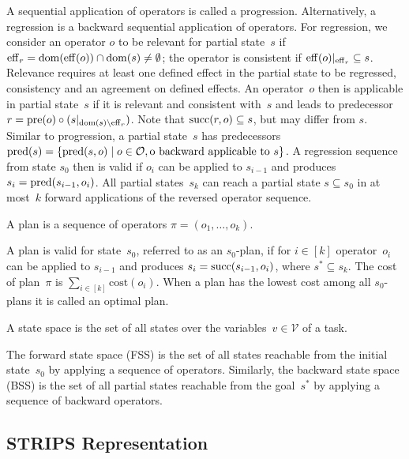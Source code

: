 A sequential application of operators is called a progression. Alternatively, a regression is a backward sequential application of operators. For regression, we consider an operator $o$ to be relevant for partial state~$s$ if $\operatorname{eff}_r=\operatorname{dom}(\operatorname{eff}(o))\cap\operatorname{dom}(s)\neq\emptyset$; the operator is consistent if $\operatorname{eff}(o)|_{\operatorname{eff}_r} \subseteq s$. Relevance requires at least one defined effect in the partial state to be regressed, consistency and an agreement on defined effects. An operator~$o$ then is  applicable in partial state~$s$ if it is relevant and consistent with~$s$ and leads to predecessor $r=\operatorname{pre}(o)\circ (s|_{\operatorname{dom}(s)\setminus\operatorname{eff}_r})$. Note that $\operatorname{succ}(r,o)\subseteq s$, but may differ from $s$. Similar to progression, a partial state~$s$ has predecessors $\operatorname{pred}(s)=\{\operatorname{pred}(s,o)\mid o\in \mathcal{O}, \text{o backward applicable to }s\}$. A regression sequence from state $s_0$ then is valid if $o_i$ can be applied to $s_{i-1}$ and produces $s_i=\operatorname{pred}(s_{i-1},o_i)$. All partial states~$s_k$ can reach a partial state $s\subseteq s_0$ in at most~$k$ forward applications of the reversed operator sequence.

\begin{definition}[Plan]\label{def:plan}
    A plan is a sequence of operators $\pi=(o_1,\ldots,o_k)$.
\end{definition}

A plan is valid for state~$s_0$, referred to as an $s_0$-plan, if for $i\in[k]$ operator~$o_i$ can be applied to $s_{i-1}$ and produces $s_i=\operatorname{succ}(s_{i-1},o_i)$, where $s^* \subseteq s_k$. The cost of plan~$\pi$ is $\sum_{i\in[k]} \text{cost}(o_i)$. When a plan has the lowest cost among all $s_0$-plans it is called an optimal plan.

\begin{definition}\label{def:statespace}
    A state space is the set of all states over the variables~$v \in \mathcal{V}$ of a task.
\end{definition}

The forward state space (FSS) is the set of all states reachable from the initial state~$s_0$ by applying a sequence of operators. Similarly, the backward state space (BSS) is the set of all partial states reachable from the goal~$s^*$ by applying a sequence of backward operators.

\subsection{STRIPS Representation}
\label{sec:background_strips}

